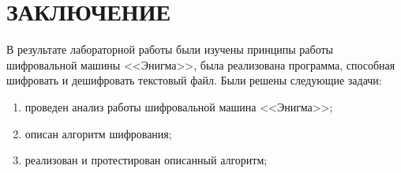 \chapter*{ЗАКЛЮЧЕНИЕ}

В результате лабораторной работы были изучены принципы работы шифровальной машины <<Энигма>>, была реализована программа, способная шифровать и дешифровать текстовый файл.
Были решены следующие задачи:

\begin{enumerate}
	\item проведен анализ работы шифровальной машина <<Энигма>>;
	\item описан алгоритм шифрования;
	\item реализован и протестирован описанный алгоритм;
\end{enumerate}


